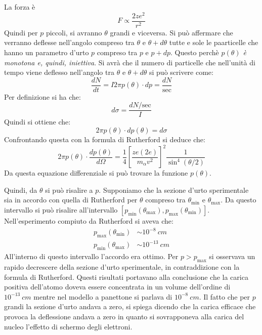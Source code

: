 La forza è
\begin{equation}
F \propto \dfrac{2ze^{2}}{r^{2}}
\end{equation}
Quindi per $p$ piccoli, si avranno $\theta$ grandi e viceversa. Si può 
affermare
che verranno deflesse nell'angolo compreso tra $\theta$ e $\theta +d\theta$
tutte e sole le paarticelle che hanno un parametro d'urto $p$ compreso tra $p$ e
$p + dp$. Questo perchè \textit{$p(\theta)$ è monotona e, quindi, iniettiva}. 
Si
avrà che il numero di particelle che nell'unità di tempo viene deflesso
nell'angolo tra $\theta$ e $\theta + d\theta$ si può scrivere come:
\begin{equation}
  \frac{dN}{dt} = I2\pi p(\theta) \cdot dp = \dfrac{dN}{\text{sec}}
\end{equation}
Per definizione si ha che:
\begin{equation}
  d\sigma = \dfrac{dN/\text{sec}}{I}
\end{equation}
Quindi si ottiene che:
\begin{equation}
2\pi p(\theta) \cdot dp(\theta) = d\sigma
\end{equation}
Confrontando questa con la formula di Rutherford si deduce che:
\begin{equation}
2\pi p(\theta) \cdot \dfrac{dp(\theta)}{d\Omega} = 
\dfrac{1}{4}\left[\dfrac{ze(2e)}{m_{\alpha}v^{2}} \right] ^{2} \dfrac{1}{\sin 
^{4} (\theta /2)}
\end{equation}
Da questa equazione differenziale si può trovare la funzione $p(\theta)$.

Quindi, da $\theta$ si può risalire a $p$. Supponiamo che la sezione d'urto
sperimentale sia in accordo con quella di Rutherford per $\theta$ compreso tra
$\theta _\text{min}$ e $\theta _\text{max}$. Da questo intervallo si può
risalire all'intervallo $\left[p_\text{min} (\theta _\text{max}), p_\text{max}
(\theta _\text{min}) \right]$. Nell'esperimento compiuto da Rutherford si aveva
che:
\begin{align}
p_\text{max} (\theta _\text{min}) & \sim 10^{-8} \ cm \\
p_\text{min} (\theta _\text{max}) & \sim 10^{-13} \ cm 
\end{align}
All'interno di questo intervallo l'accordo era ottimo. Per $p > p_\text{max}$ si
osservava un rapido decrescere della sezione d'urto sperimentale, in
contraddizione con la formula di Rutherford. Questi risultati portavano alla
conclusione che la carica positiva dell'atomo doveva essere concentrata in un
volume dell'ordine di $10^{-13}\ cm$ mentre nel modello a panettone si parlava
di $10^{-8} \ cm$. Il fatto che per $p$ grandi la sezione d'urto andava a zero,
si spiega dicendo che la carica efficace che provoca la deflessione andava a
zero in quanto si sovrapponeva alla carica del nucleo l'effetto di schermo degli
elettroni.
